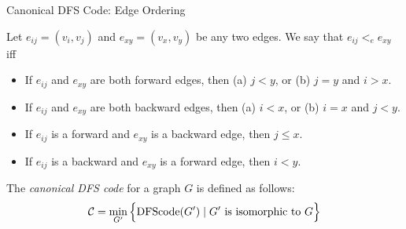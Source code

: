 \begin{frame}{Canonical DFS Code: Edge Ordering}

Let $e_{ij} = (v_i,v_{j})$ and $e_{xy} = (v_x,v_y)$ be
any two edges. We say that $e_{ij} <_e e_{xy}$ iff
\begin{itemize}
  \item If $e_{ij}$ and $e_{xy}$ are both forward edges, then (a) $j < y$, or (b) $j=y$ and $i > x$. 
	
  \item If $e_{ij}$ and $e_{xy}$ are both backward edges, then (a) $i<x$, or
  (b) $i=x$ and $j < y$. 

\item If $e_{ij}$ is a forward and $e_{xy}$ is a backward edge, then $j
  \le x$. 

\item If $e_{ij}$ is a backward and $e_{xy}$ is a forward edge, then $i < y$.
\end{itemize}

\bigskip
The {\em canonical DFS code}
for a graph $G$ is def\/{i}ned as follows:
\begin{align*}
  {\mathcal C} = \min_{G'} \Big\{\text{DFScode}(G') \mid G' \text{ is isomorphic to } G\Big\}
\end{align*}
\end{frame}


